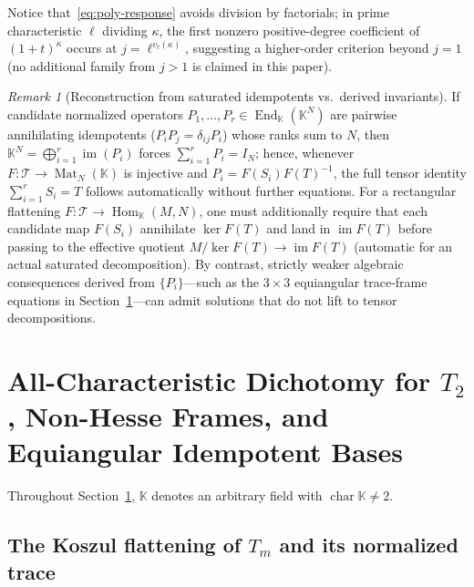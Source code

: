 \documentclass[11pt,reqno]{amsart}
\theoremstyle{definition}
\theoremstyle{remark}
\newtheorem{remark}[theorem]{Remark}
\numberwithin{equation}{section}
\newcommand{\KK}{\mathbb{K}}
\newcommand{\cT}{\mathcal{T}}
\DeclareMathOperator{\Mat}{Mat}
\DeclareMathOperator{\End}{End}
\DeclareMathOperator{\Hom}{Hom}
\DeclareMathOperator{\im}{im}
\DeclareMathOperator{\chr}{char}
\begin{document}
Notice that~\eqref{eq:poly-response} avoids division by factorials; in prime characteristic $\ell$ dividing $\kappa$, the first nonzero positive-degree coefficient of $(1+t)^\kappa$ occurs at $j = \ell^{v_\ell(\kappa)}$, suggesting a higher-order criterion beyond $j = 1$ (no additional family from $j > 1$ is claimed in this paper).

\begin{remark}[Reconstruction from saturated idempotents vs.\ derived invariants]\label{rem:reconstruction}
If candidate normalized operators $P_1, \dots, P_r \in \End_{\KK}(\KK^N)$ are pairwise annihilating idempotents ($P_i P_j = \delta_{ij} P_i$) whose ranks sum to $N$, then $\KK^N = \bigoplus_{i=1}^r \im(P_i)$ forces $\sum_{i=1}^r P_i = I_N$; hence, whenever $F : \cT \to \Mat_N(\KK)$ is injective and $P_i = F(S_i) F(T)^{-1}$, the full tensor identity $\sum_{i=1}^r S_i = T$ follows automatically without further equations. For a rectangular flattening $F : \cT \to \Hom_{\KK}(M, N)$, one must additionally require that each candidate map $F(S_i)$ annihilate $\ker F(T)$ and land in $\im F(T)$ before passing to the effective quotient $M/\ker F(T) \to \im F(T)$ (automatic for an actual saturated decomposition). By contrast, strictly weaker algebraic consequences derived from $\{P_i\}$---such as the $3 \times 3$ equiangular trace-frame equations in Section~\ref{sec:dichotomy}---can admit solutions that do not lift to tensor decompositions.
\end{remark}

\section{All-Characteristic Dichotomy for \texorpdfstring{$T_2$}{T2}, Non-Hesse Frames, and Equiangular Idempotent Bases}\label{sec:dichotomy}

Throughout Section~\ref{sec:dichotomy}, $\KK$ denotes an arbitrary field with $\chr\KK \neq 2$.

\subsection{The Koszul flattening of \texorpdfstring{$T_m$}{Tm} and its normalized trace}
\end{document}
